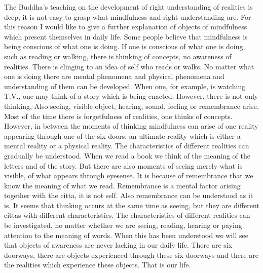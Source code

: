 \documentclass{book}
\begin{document}
The Buddha's teaching on the development of right understanding of
realities is deep, it is not easy to grasp what mindfulness and right
understanding are. For this reason I would like to give a further
explanation of objects of mindfulness which present themselves in daily
life. Some people believe that mindfulness is being conscious of what
one is doing. If one is conscious of what one is doing, such as reading
or walking, there is thinking of concepts, no awareness of realities.
There is clinging to an idea of self who reads or walks. No matter what
one is doing there are mental phenomena and physical phenomena and
understanding of them can be developed. When one, for example, is
watching T.V., one may think of a story which is being enacted.
However, there is not only thinking, Also seeing, visible object,   hearing, sound, feeling or remembrance arise. Most of the time there
is forgetfulness of realities, one thinks of concepts. However,
in between the moments of thinking mindfulness can arise of one
reality appearing through one of the six doors, an ultimate reality
which is either a mental reality or a physical reality. The
characteristics of different realities can gradually be understood. When  we read a book we think of the meaning of the letters and of the story.  But there are also moments of seeing merely what is visible, of what appears through eyesense. It is because of remem­brance that we know    the meaning of what we read. Remembrance is a mental factor arising together with the citta, it is not self. Also remembrance can be  understood as it is. It seems that thinking occurs at the same time as seeing, but they are different cittas with different chara­cter­istics. The characteristics of different realities can be investigated, no matter
whether we are seeing, reading, hearing or paying attention to the
meaning of words. When this has been understood we will see that objects
of awareness are never lacking in our daily life. There are six
doorways, there are objects experienced through these six doorways and
there are the realities which experience these objects. That is our
life.
\end{document}
